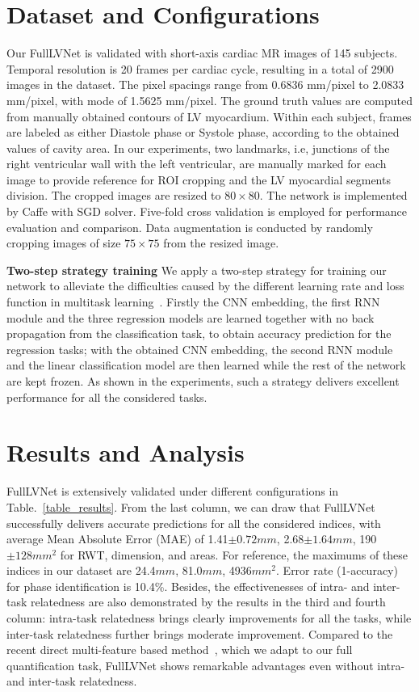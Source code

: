 \documentclass{llncs}
\begin{document}
\section{Dataset and Configurations}

Our FullLVNet is validated with short-axis cardiac MR images of 145 subjects. Temporal resolution is 20 frames per cardiac cycle, resulting in a total of 2900 images in the dataset. The pixel spacings range from 0.6836 mm/pixel to 2.0833 mm/pixel, with mode of 1.5625 mm/pixel. The ground truth values are computed from manually obtained contours of LV myocardium. Within each subject, frames are labeled as either Diastole phase or Systole phase, according to the obtained values of cavity area.
In our experiments, two landmarks, i.e, junctions of the right ventricular wall with the left ventricular, are manually marked for each image to provide reference for ROI cropping and the LV myocardial segments division. The cropped images are resized to $80\times80$. The network is implemented by Caffe with SGD solver. Five-fold cross validation is employed for performance evaluation and comparison. Data augmentation is conducted by randomly cropping images of size $75\times 75$ from the resized image. %

\textbf{Two-step strategy training} 
We apply a two-step strategy for training our network to alleviate the difficulties caused by the different learning rate and loss function in multitask learning~\cite{zhang2010convex,zhang2014facial}. 
Firstly the CNN embedding, the first RNN module and the three regression models are learned together with no back propagation from the classification task, to obtain accuracy prediction for the regression tasks; with the obtained CNN embedding, the second RNN module and the linear classification model are then learned while the rest of the network are kept frozen. As shown in the experiments, such a strategy delivers excellent performance for all the considered tasks.

\section{Results and Analysis}
FullLVNet is extensively validated under different configurations in Table.~\ref{table_results}. From the last column, we can draw that FullLVNet successfully delivers accurate predictions for all the considered indices, with average Mean Absolute Error (MAE) of 1.41$\pm0.72mm$, 2.68$\pm1.64mm$, 190$\pm128mm^2$ for RWT, dimension, and areas. For reference, the maximums of these indices in our dataset are 24.4$mm$, 81.0$mm$, 4936$mm^2$. Error rate (1-accuracy) for phase identification is 10.4\%.
Besides, the effectivenesses of intra- and inter-task relatedness are also demonstrated by the results in the third and fourth column: intra-task relatedness brings clearly improvements for all the tasks, while inter-task relatedness further brings moderate improvement. Compared to the recent direct multi-feature based method~\cite{zhen2015multi}, which we adapt to our full quantification task, FullLVNet shows remarkable advantages even without intra- and inter-task relatedness. 
\end{document}
